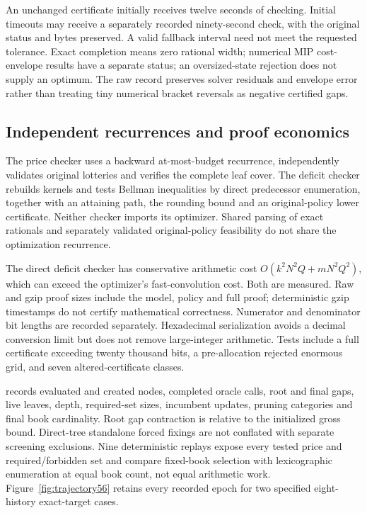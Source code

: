 An unchanged certificate initially receives twelve seconds of checking. Initial timeouts may receive a separately recorded ninety-second check, with the original status and bytes preserved. A valid fallback interval need not meet the requested tolerance. Exact completion means zero rational width; numerical MIP cost-envelope results have a separate status; an oversized-state rejection does not supply an optimum. The raw record preserves solver residuals and envelope error rather than treating tiny numerical bracket reversals as negative certified gaps.

\subsection{Independent recurrences and proof economics}
The price checker uses a backward at-most-budget recurrence, independently validates original lotteries and verifies the complete leaf cover. The deficit checker rebuilds kernels and tests Bellman inequalities by direct predecessor enumeration, together with an attaining path, the rounding bound and an original-policy lower certificate. Neither checker imports its optimizer. Shared parsing of exact rationals and separately validated original-policy feasibility do not share the optimization recurrence.

The direct deficit checker has conservative arithmetic cost $O(k^2N^2Q+mN^2Q^2)$, which can exceed the optimizer's fast-convolution cost. Both are measured. Raw and gzip proof sizes include the model, policy and full proof; deterministic gzip timestamps do not certify mathematical correctness. Numerator and denominator bit lengths are recorded separately. Hexadecimal serialization avoids a decimal conversion limit but does not remove large-integer arithmetic. Tests include a full certificate exceeding twenty thousand bits, a pre-allocation rejected enormous grid, and seven altered-certificate classes.

 records evaluated and created nodes, completed oracle calls, root and final gaps, live leaves, depth, required-set sizes, incumbent updates, pruning categories and final book cardinality. Root gap contraction is relative to the initialized gross bound. Direct-tree standalone forced fixings are not conflated with separate screening exclusions. Nine deterministic replays expose every tested price and required/forbidden set and compare fixed-book selection with lexicographic enumeration at equal book count, not equal arithmetic work. Figure~\ref{fig:trajectory56} retains every recorded epoch for two specified eight-history exact-target cases.


